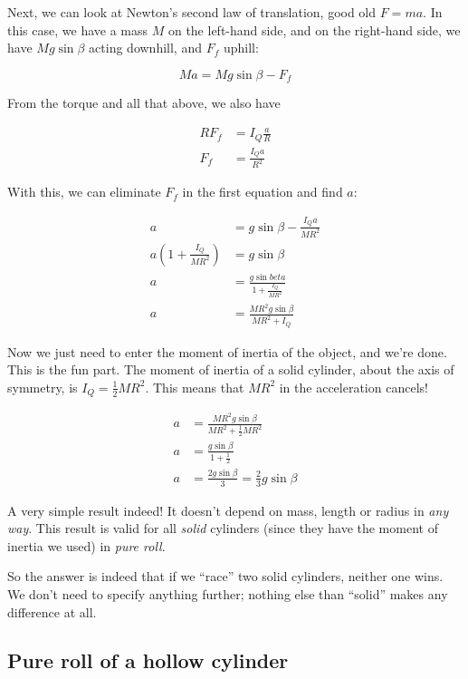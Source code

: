 Next, we can look at Newton's second law of translation, good old $F = m a$. In this case, we have a mass $M$ on the left-hand side, and on the right-hand side, we have $M g \sin \beta$ acting downhill, and $F_f$ uphill:

\begin{equation}
M a = M g \sin \beta - F_f
\end{equation}

From the torque and all that above, we also have

\begin{align}
R F_f &= I_Q \frac{a}{R}\\
F_f &= \frac{I_Q a}{R^2}
\end{align}

With this, we can eliminate $F_f$ in the first equation and find $a$:

\begin{align}
a &= g \sin \beta - \frac{I_Q a}{M R^2}\\
a \left(1 + \frac{I_Q}{M R^2}\right) &= g \sin \beta\\
a &= \frac{g \sin beta}{1 + \frac{I_Q}{M R^2}}\\
a &= \frac{M R^2 g \sin \beta}{M R^2 + I_Q}
\end{align}

Now we just need to enter the moment of inertia of the object, and we're done. This is the fun part. The moment of inertia of a solid cylinder, about the axis of symmetry, is $I_Q = \frac{1}{2} M R^2$. This means that $M R^2$ in the acceleration cancels!

\begin{align}
a &= \frac{M R^2 g \sin \beta}{M R^2 + \frac{1}{2} M R^2}\\
a &= \frac{g \sin \beta}{1 + \frac{1}{2}}\\
a &= \frac{2 g \sin \beta}{3} = \frac{2}{3} g \sin \beta
\end{align}

A very simple result indeed! It doesn't depend on mass, length or radius in \emph{any way}. This result is valid for all \emph{solid} cylinders (since they have the moment of inertia we used) in \emph{pure roll}.

So the answer is indeed that if we ``race'' two solid cylinders, neither one wins. We don't need to specify anything further; nothing else than ``solid'' makes any difference at all.

\subsection{Pure roll of a hollow cylinder}


